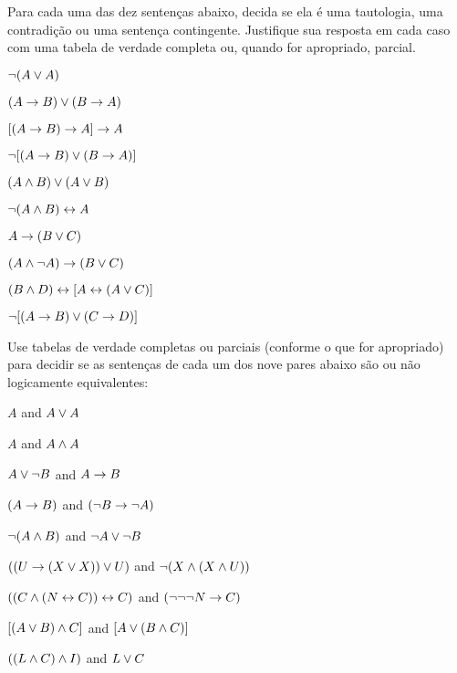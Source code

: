 \noindent\problempart
\label{pr.TT.TTorC4}
Para cada uma das dez sentenças abaixo, decida se ela é uma tautologia, uma contradição ou uma sentença contingente.
Justifique sua resposta em cada caso com uma tabela de verdade completa ou, quando for apropriado, parcial.
\begin{earg}
\item  $\neg (A \vee A)$\vspace{.5ex}							%
\item $(A \rightarrow B) \vee (B \rightarrow A)$\vspace{.5ex}					%
\item $[(A \rightarrow B) \rightarrow A] \rightarrow A$\vspace{.5ex}					%
\item $\neg[( A \rightarrow B) \vee (B \rightarrow A)]$\vspace{.5ex}			%
\item $(A \wedge B) \vee (A \vee B)$\vspace{.5ex} 				%
\item $\neg(A\wedge B) \leftrightarrow A$\vspace{.5ex} 					%
\item $A\rightarrow(B\vee C)$\vspace{.5ex} 							%
\item $(A \wedge\neg A) \rightarrow (B \vee C)$\vspace{.5ex} 			%
\item $(B\wedge D) \leftrightarrow [A \leftrightarrow(A \vee C)]$\vspace{.5ex}			%
\item $\neg[(A \rightarrow B) \vee (C \rightarrow D)]$\vspace{.5ex} 			%
\end{earg}


\noindent\problempart
Use tabelas de verdade completas ou parciais (conforme o que for apropriado) para decidir se as sentenças de cada um dos nove pares abaixo são ou não logicamente equivalentes:
\begin{earg}
\item $A$ and $A \vee A$
\item $A$ and $A \wedge A$
\item $A \vee \neg B$ and $A\rightarrow B$
\item $(A \rightarrow B)$ and $(\neg B \rightarrow \neg A)$
\item $\neg(A \wedge B)$ and $\neg A \vee \neg B$
\item $ ((U \rightarrow (X \vee X)) \vee U)$ and $\neg (X \wedge (X \wedge U))$
\item $ ((C \wedge (N \leftrightarrow C)) \leftrightarrow C)$ and $(\neg \neg \neg N \rightarrow C)$
\item $[(A \vee B) \wedge C]$ and $[A \vee (B \wedge C)]$
\item $((L \wedge C) \wedge I)$ and $L \vee C$
\end{earg}



